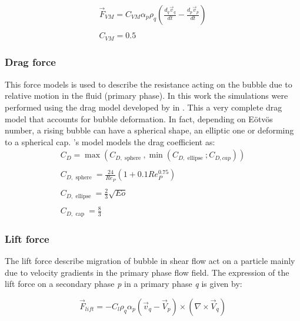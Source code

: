 \documentclass[11pt,a4paper]{article}
\begin{document}
\begin{equation}
\begin{array}{l}
\vec{F}_{VM}=C_{VM} \alpha_{p} \rho_{q}\left(\frac{d_{q} \vec{v}_{q}}{d t}-\frac{d_{p} \vec{v}_{p}}{d t}\right)\\ \\
C_{VM}=0.5
\end{array}
\label{eq:virtual}
\end{equation}


\subsubsection{Drag force}

This force models is used to describe the resistance acting on the bubble due to relative motion in the fluid (primary phase). In this work the simulations were performed using the drag model developed by \citeauthor{ishiizuber} in \cite{ishiizuber}. This a very complete drag model that accounts for bubble deformation. In fact, depending on E{ö}tv{ö}s number, a rising bubble can have a spherical shape, an elliptic one or deforming to a spherical cap. \citeauthor{ishiizuber}'s model models the drag coefficient as:
\begin{equation}
\begin{array}{l}
C_{D}=\max \left(C_{D, \text { sphere }}, \min \left(C_{D, \text { ellipse }}; C_{D, c a p}\right)\right) \\ \\
C_{D, \text { sphere }}=\frac{24}{R e_{P}}\left(1+0.1 R e_{P}^{0.75}\right) \\ \\
C_{D, \text { ellipse }}=\frac{2}{3} \sqrt{E o} \\ \\
C_{D, \text { cap }}=\frac{8}{3}
\end{array}
\label{eq:drag}
\end{equation}

\subsubsection{Lift force}
The lift force describe migration of bubble in shear flow act on a particle mainly due to velocity gradients in the primary phase flow field. The expression of the lift force on a secondary phase \textit{p} in a primary phase \textit{q} is given by:

\begin{equation}
\vec{F}_{l i f t}=-C_{l} \rho_{q} \alpha_{p}\left(\vec{v}_{q}-\vec{V}_{p}\right) \times\left(\nabla \times \vec{V}_{q}\right)
\end{equation}
\end{document}
